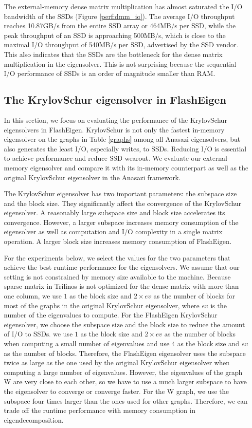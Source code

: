 The external-memory dense matrix multiplication has almost saturated
the I/O bandwidth of the SSDs (Figure \ref{perf:dmm_io}). The average
I/O throughput reaches 10.87GB/s from the entire SSD array or 464MB/s
per SSD, while the peak throughput of an SSD is approaching 500MB/s,
which is close to the maximal I/O throughput of 540MB/s per SSD, advertised by
the SSD vendor. This also indicates that the SSDs are the bottleneck for
the dense matrix multiplication in the eigensolver. This is not
surprising because the sequential I/O performance of SSDs is an order of
magnitude smaller than RAM. 

\subsection{The KrylovSchur eigensolver in FlashEigen}
In this section, we focus on evaluating the performance of the KrylovSchur
eigensolvers in FlashEigen. KrylovSchur is not only the fastest in-memory
eigensolver on the graphs in Table \ref{graphs} among all Anasazi eigensolvers,
but also generates the least I/O, especially writes,
to SSDs. Reducing I/O is essential to achieve performance and reduce SSD
wearout. We evaluate our external-memory eigensolver and compare it
with its in-memory counterpart as well as the original KrylovSchur eigensolver
in the Anasazi framework.

The KrylovSchur eigensolver has two important parameters: the subspace size
and the block size. They significantly affect the convergence of
the KrylovSchur eigensolver. A reasonably large subspace size and block size
accelerates its convergence. However, a larger subspace increases memory
consumption of the eigensolver as well as computation and I/O complexity
in a single matrix operation. A larger block size increases memory consumption
of FlashEigen.

For the experiments below, we select the values for the two parameters that
achieve the best runtime performance for the eigensolvers. We assume that
our setting is not constrained by memory size available to the machine.
Because sparse matrix in Trilinos is not optimized for
the dense matrix with more than one column, we use $1$ as the block size and
$2 \times ev$ as the number of blocks for most of the graphs in the original
KrylovSchur eigensolver, where $ev$ is the number of the eigenvalues to compute.
For the FlashEigen KrylovSchur eigensolver, we choose the subspace size and
the block size to reduce the amount of I/O to SSDs. we use $1$ as the block size and
$2 \times ev$ as the number of blocks when computing a small number of eigenvalues
and use $4$ as the block size and $ev$ as the number of blocks. Therefore,
the FlashEigen eigensolver uses the subspace twice as large as the one used by
the original KrylovSchur eigensolver when computing a large number of eigenvalues.
However, the eigenvalues of the graph W are very close to each other, so we have
to use a much larger subspace to have the eigensolver to converge or converge
faster. For the W graph, we use the subspace four times larger than the ones
used for other graphs. Therefore, we can trade off the runtime performance
with memory consumption in eigendecomposition.

